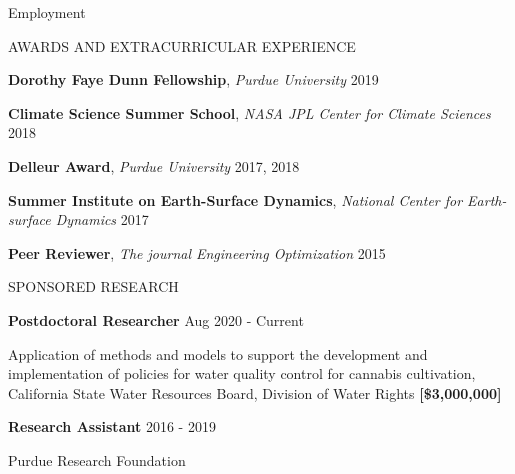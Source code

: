 \documentclass{resume_anzy} %
\begin{document}
\begin{rSection}{Employment}



\end{rSection}

\begin{rSection}{AWARDS AND EXTRACURRICULAR  EXPERIENCE}
\vspace{-2.5mm}
\item \textbf{Dorothy Faye Dunn Fellowship}, \textit{Purdue University} \hfill{2019}
\item \textbf{Climate Science Summer School}, \textit{NASA JPL Center for Climate Sciences} \hfill{2018}
\item \textbf{Delleur Award}, \textit{Purdue University} \hfill{2017, 2018}
\item \textbf{Summer Institute on Earth-Surface Dynamics}, \textit{National Center for Earth-surface Dynamics} \hfill{2017}
\item \textbf{Peer Reviewer}, \textit{The journal Engineering Optimization} \hfill{2015}
\end{rSection}


\vspace{2.5mm}


\begin{rSection}{SPONSORED RESEARCH}
\vspace{-2.5mm}
\item \textbf{Postdoctoral Researcher} \hfill{Aug 2020 - Current}
\item  Application of methods and models to support the development and implementation of policies for water quality control for cannabis cultivation, California State Water Resources Board, Division of Water Rights \textbf{[\$3,000,000]}
\item \textbf{Research Assistant} \hfill{2016 - 2019}
\item Purdue Research Foundation
\end{rSection}
\end{document}
